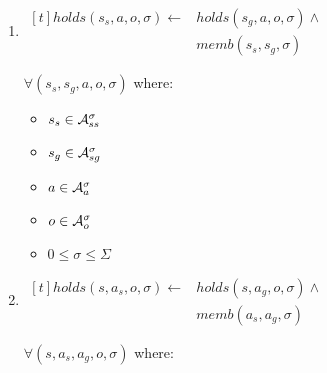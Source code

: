 \documentclass[10pt, twocolumn]{article}
\begin{document}
            \begin{enumerate}
              \item
                \begin{math}
                  \begin{aligned}[t]
                    holds(s_{s}, a, o, \sigma) \leftarrow &
                    holds(s_{g}, a, o, \sigma) \land \\
                    & memb(s_{s}, s_{g}, \sigma)
                  \end{aligned}
                \end{math}

                $\forall (s_{s}, s_{g}, a, o, \sigma)$ where:

                \begin{itemize}
                  \item
                    $s_{s} \in {\cal A}^{\sigma}_{ss}$
                  \item
                    $s_{g} \in {\cal A}^{\sigma}_{sg}$
                  \item
                    $a \in {\cal A}^{\sigma}_{a}$
                  \item
                    $o \in {\cal A}^{\sigma}_{o}$
                  \item
                    $0 \leq \sigma \leq \Sigma$
                \end{itemize}
              \item
                \begin{math}
                  \begin{aligned}[t]
                    holds(s, a_{s}, o, \sigma) \leftarrow &
                    holds(s, a_{g}, o, \sigma) \land \\
                    & memb(a_{s}, a_{g}, \sigma)
                  \end{aligned}
                \end{math}

                $\forall (s, a_{s}, a_{g}, o, \sigma)$ where:


\end{enumerate}
\end{document}

